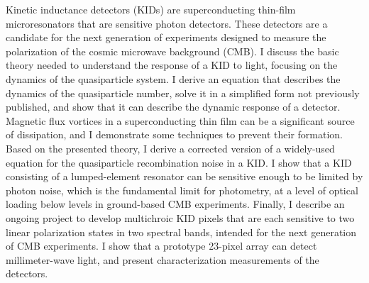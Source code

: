 Kinetic inductance detectors (KIDs) are superconducting thin-film microresonators that are sensitive photon detectors.
These detectors are a candidate for the next generation of experiments designed to measure the polarization of the cosmic microwave background (CMB).
I discuss the basic theory needed to understand the response of a KID to light, focusing on the dynamics of the quasiparticle system.
I derive an equation that describes the dynamics of the quasiparticle number, solve it in a simplified form not previously published, and show that it can describe the dynamic response of a detector. 
Magnetic flux vortices in a superconducting thin film can be a significant source of dissipation, and I demonstrate some techniques to prevent their formation.
Based on the presented theory, I derive a corrected version of a widely-used equation for the quasiparticle recombination noise in a KID.
I show that a KID consisting of a lumped-element resonator can be sensitive enough to be limited by photon noise, which is the fundamental limit for photometry, at a level of optical loading below levels in ground-based CMB experiments.
Finally, I describe an ongoing project to develop multichroic KID pixels that are each sensitive to two linear polarization states in two spectral bands, intended for the next generation of CMB experiments.
I show that a prototype 23-pixel array can detect millimeter-wave light, and present characterization measurements of the detectors.
